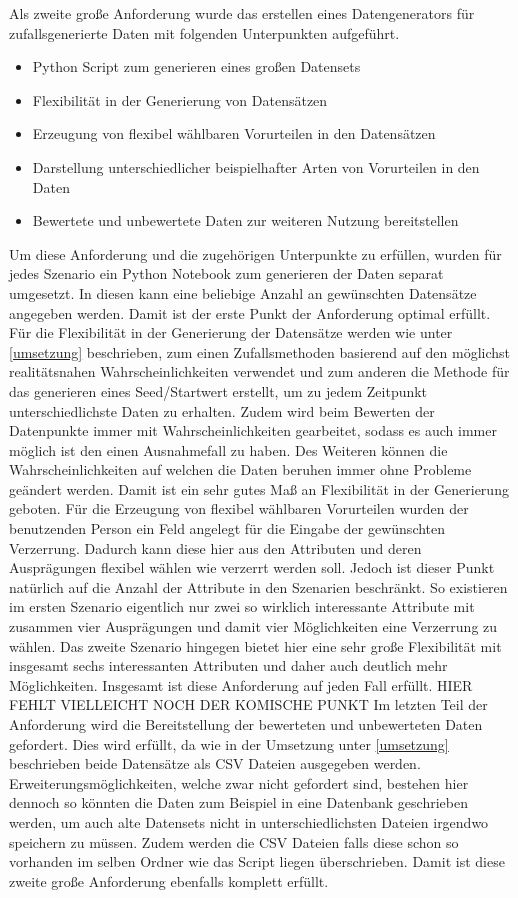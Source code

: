 \begin{onehalfspace}
Als zweite große Anforderung wurde das erstellen eines Datengenerators für zufallsgenerierte Daten mit folgenden Unterpunkten aufgeführt.
\begin{itemize}
    \item Python Script zum generieren eines großen Datensets
    \item Flexibilität in der Generierung von Datensätzen
    \item Erzeugung von flexibel wählbaren Vorurteilen in den Datensätzen
    \item Darstellung unterschiedlicher beispielhafter Arten von Vorurteilen in den Daten
    \item Bewertete und unbewertete Daten zur weiteren Nutzung bereitstellen
\end{itemize}
Um diese Anforderung und die zugehörigen Unterpunkte zu erfüllen, wurden für jedes Szenario ein Python Notebook zum generieren der Daten separat umgesetzt. In diesen kann eine beliebige Anzahl an gewünschten Datensätze angegeben werden. Damit ist der erste Punkt der Anforderung optimal erfüllt. Für die Flexibilität in der Generierung der Datensätze werden wie unter \ref{umsetzung} beschrieben, zum einen Zufallsmethoden basierend auf den möglichst realitätsnahen Wahrscheinlichkeiten verwendet und zum anderen die Methode für das generieren eines Seed/Startwert erstellt, um zu jedem Zeitpunkt unterschiedlichste Daten zu erhalten. Zudem wird beim Bewerten der Datenpunkte immer mit Wahrscheinlichkeiten gearbeitet, sodass es auch immer möglich ist den einen Ausnahmefall zu haben. Des Weiteren können die Wahrscheinlichkeiten auf welchen die Daten beruhen immer ohne Probleme geändert werden. Damit ist ein sehr gutes Maß an Flexibilität in der Generierung geboten.
Für die Erzeugung von flexibel wählbaren Vorurteilen wurden der benutzenden Person ein Feld angelegt für die Eingabe der gewünschten Verzerrung. Dadurch kann diese hier aus den Attributen und deren Ausprägungen flexibel wählen wie verzerrt werden soll. Jedoch ist dieser Punkt natürlich auf die Anzahl der Attribute in den Szenarien beschränkt. So existieren im ersten Szenario eigentlich nur zwei so wirklich interessante Attribute mit zusammen vier Ausprägungen und damit vier Möglichkeiten eine Verzerrung zu wählen. Das zweite Szenario hingegen bietet hier eine sehr große Flexibilität mit insgesamt sechs interessanten Attributen und daher auch deutlich mehr Möglichkeiten. Insgesamt ist diese Anforderung auf jeden Fall erfüllt. 
HIER FEHLT VIELLEICHT NOCH DER KOMISCHE PUNKT 
Im letzten Teil der Anforderung wird die Bereitstellung der bewerteten und unbewerteten Daten gefordert. Dies wird erfüllt, da wie in der Umsetzung unter \ref{umsetzung} beschrieben beide Datensätze als CSV Dateien ausgegeben werden. Erweiterungsmöglichkeiten, welche zwar nicht gefordert sind, bestehen hier dennoch so könnten die Daten zum Beispiel in eine Datenbank geschrieben werden, um auch alte Datensets nicht in unterschiedlichsten Dateien irgendwo speichern zu müssen. Zudem werden die CSV Dateien falls diese schon so vorhanden im selben Ordner wie das Script liegen überschrieben. Damit ist diese zweite große Anforderung ebenfalls komplett erfüllt.\\

\end{onehalfspace}
